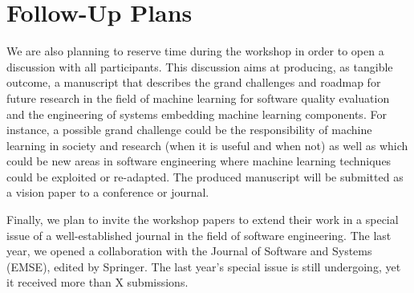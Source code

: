
\section{Follow-Up Plans}

We are also planning to reserve time during the workshop in order to open a discussion with all participants.
This discussion aims at producing, as tangible outcome, a manuscript that describes the grand challenges and roadmap for future research in the field of machine learning for software quality evaluation and the engineering of systems embedding machine learning components.
For instance, a possible grand challenge could be the responsibility of machine learning in society and research (\eg when it is useful and when not) as well as which could be new areas in software engineering where machine learning techniques could be exploited or re-adapted.
The produced manuscript will be submitted as a vision paper to a conference or journal.

Finally, we plan to invite the workshop papers to extend their work in a special issue of a well-established journal in the field of software engineering.
The last year, we opened a collaboration with the Journal of Software and Systems (EMSE), edited by Springer.
The last year's special issue is still undergoing, yet it received more than X submissions.
